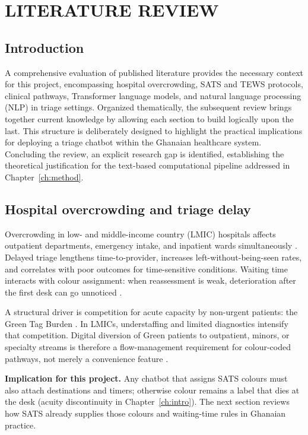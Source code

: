 \chapter{LITERATURE REVIEW}
\label{ch:lit}

\section{Introduction}

A comprehensive evaluation of published literature provides the necessary context for this project, encompassing hospital overcrowding, SATS and TEWS protocols, clinical pathways, Transformer language models, and natural language processing (NLP) in triage settings. Organized thematically, the subsequent review brings together current knowledge by allowing each section to build logically upon the last. This structure is deliberately designed to highlight the practical implications for deploying a triage chatbot within the Ghanaian healthcare system. Concluding the review, an explicit research gap is identified, establishing the theoretical justification for the text-based computational pipeline addressed in Chapter~\ref{ch:method}.

\section{Hospital overcrowding and triage delay}

Overcrowding in low- and middle-income country (LMIC) hospitals affects outpatient departments, emergency intake, and inpatient wards simultaneously \citep{kathsats,Mitchell2023}. Delayed triage lengthens time-to-provider, increases left-without-being-seen rates, and correlates with poor outcomes for time-sensitive conditions. Waiting time interacts with colour assignment: when reassessment is weak, deterioration after the first desk can go unnoticed \citep{Nurchis2025}.

A structural driver is competition for acute capacity by non-urgent patients: the Green Tag Burden \citep{Yilmaz2021}. In LMICs, understaffing and limited diagnostics intensify that competition. Digital diversion of Green patients to outpatient, minors, or specialty streams is therefore a flow-management requirement for colour-coded pathways, not merely a convenience feature \citep{Sundstrom2014}.

\textbf{Implication for this project.} Any chatbot that assigns SATS colours must also attach destinations and timers; otherwise colour remains a label that dies at the desk (acuity discontinuity in Chapter~\ref{ch:intro}). The next section reviews how SATS already supplies those colours and waiting-time rules in Ghanaian practice.

